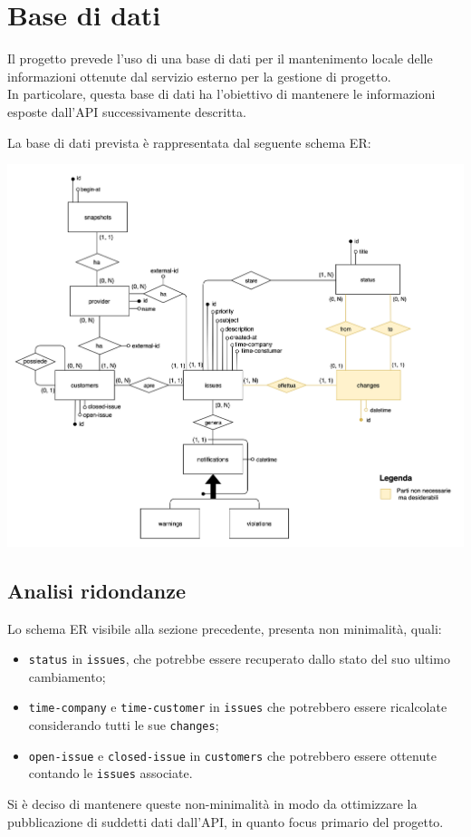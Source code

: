 \section{Base di dati}
    Il progetto prevede l'uso di una base di dati per il mantenimento locale delle informazioni ottenute dal servizio esterno per la gestione di progetto. \\
    In particolare, questa base di dati ha l'obiettivo di mantenere le informazioni esposte dall'API successivamente descritta. \\
    \par La base di dati prevista è rappresentata dal seguente schema ER:
    \begin{center}
        \includegraphics[keepaspectratio = true, width=15cm]{immagini/progettazione/db.png}
    \end{center}
    \subsection{Analisi ridondanze}
        Lo schema ER visibile alla sezione precedente, presenta non minimalità, quali:
        \begin{itemize}
            \item \texttt{status} in \texttt{issues}, che potrebbe essere recuperato dallo stato del suo ultimo cambiamento;
            \item \texttt{time-company} e \texttt{time-customer} in \texttt{issues} che potrebbero essere ricalcolate considerando tutti le sue \texttt{changes};
            \item \texttt{open-issue} e \texttt{closed-issue} in \texttt{customers} che potrebbero essere ottenute contando le \texttt{issues} associate.
        \end{itemize} 
        Si è deciso di mantenere queste non-minimalità in modo da ottimizzare la pubblicazione di suddetti dati dall'API, in quanto focus primario del progetto.
    








